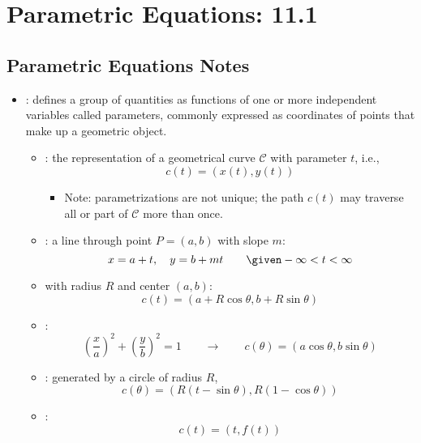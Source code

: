 \chapter{Parametric Equations: 11.1}

\section{Parametric Equations Notes}
\begin{itemize}
  \item {}: defines a group of quantities as functions of
    one or more independent variables called parameters, commonly expressed as
    coordinates of points that make up a geometric object.
    \begin{itemize}
      \item {}: the representation of a geometrical curve
        \(\mathcal{C}\) with parameter \(t\), i.e.,
        \[%
          c(t) = (x(t), y(t))
        \]%
        \begin{itemize}
          \item Note: parametrizations are not unique; the path \(c(t)\) may
            traverse all or part of \(\mathcal{C}\) more than once.
        \end{itemize}

      \item {}: a line through point \(P = (a,b)\)
        with slope \(m \):
        \[%
          x = a + t, \quad y = b + mt \qquad \given - \infty < t < \infty
        \]%

      \item {} with radius \(R\) and center \((a, b)\):
        \[%
          c(t) = (a + R \cos \theta, b + R \sin \theta)
        \]%

      \item {}:
        \[%
          \left( \frac{x}{a} \right) ^2 + \left( \frac{y}{b} \right)^2 = 1 \qquad  \to \qquad
          c(\theta) = (a \cos \theta, b \sin \theta)
        \]%

      \item {}: generated by a circle of radius \(R\),
        \[%
          c(\theta) = \left( R(t-\sin \theta), R(1-\cos \theta) \right)
        \]%

      \item {}: \[c(t) = (t, f(t))\]
    \end{itemize}


\end{itemize}
